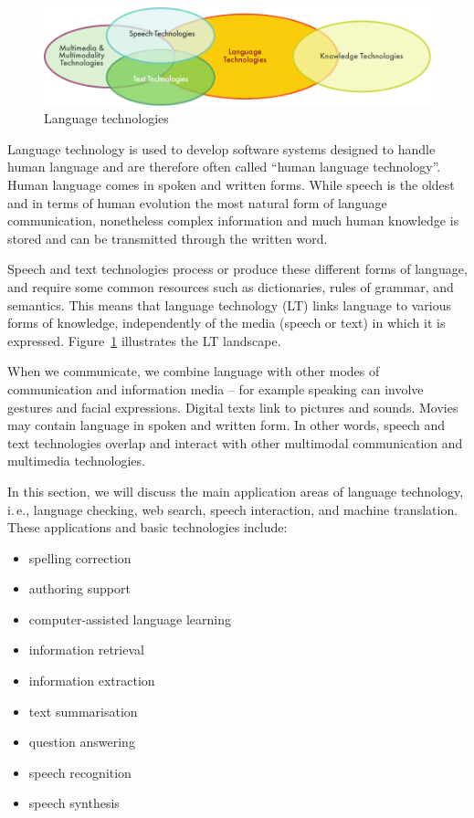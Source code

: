 \begin{multicols}{2}

\begin{figure}[htb]
  \center
  \includegraphics[width=\textwidth]{../_media/english/language_technologies}
  \caption{Language technologies}
  \label{fig:ltincontext_en}
\end{figure}

Language technology is used to develop software systems designed to handle human language and are therefore often called ``human language technology''. Human language comes in spoken and written forms. While speech is the oldest and in terms of human evolution the most natural form of language communication, nonetheless complex information and much human knowledge is stored and can be transmitted through the written word. 

Speech and text technologies process or produce these different forms of language, and require some common resources such as dictionaries, rules of grammar, and semantics. This means that language technology (LT) links language to various forms of knowledge, independently of the media (speech or text) in which it is expressed. Figure~\ref{fig:ltincontext_en} illustrates the LT landscape.

When we communicate, we combine language with other modes of communication and information media -- for example speaking can involve gestures and facial expressions. Digital texts link to pictures and sounds. Movies may contain language in spoken and written form. In other words, speech and text technologies overlap and interact with other multimodal communication and multimedia technologies.

In this section, we will discuss the main application areas of language technology, i.\,e., language checking, web search, speech interaction, and machine translation. These applications and basic technologies include:\columnbreak

\begin{itemize}
\item spelling correction
\item authoring support
\item computer-assisted language learning
\item information retrieval 
\item information extraction
\item text summarisation
\item question answering
\item speech recognition 
\item speech synthesis 
\end{itemize}


\end{multicols}
